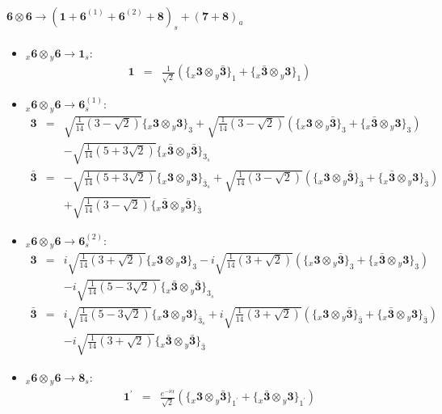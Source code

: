 \documentclass[english]{article}
\newcommand{\rep}[1]{\mathbf{#1}}
\newcommand{\repx}[2]{{}_{#2}\mathbf{#1}}
\newcommand{\subcg}[3]{\big\{ \repx{#1}{x}\otimes\repx{#2}{y}\big\}^{}_{#3}}
\begin{document}
\paragraph*{\Large $\rep{6}\otimes\rep{6}\to\left(\rep{1}+\rep{6}^{(1)}+\rep{6}^{(2)}+\rep{8}\right)_s+\left(\rep{7}+\rep{8}\right)_a$}
\begin{itemize}
\item $\repx{6}{x}\otimes\repx{6}{y}\to\rep{1}_{s}$:
\begin{eqnarray*}
\rep{1} &=& \frac{1}{\sqrt{2}}\left(\subcg{3}{\bar{3}}{1}+\subcg{\bar{3}}{3}{1}\right)
\end{eqnarray*}
\item $\repx{6}{x}\otimes\repx{6}{y}\to\rep{6}_{s}^{(1)}$:
\begin{eqnarray*}
\rep{3} &=& \sqrt{\frac{1}{14} \left(3-\sqrt{2}\right)}\subcg{3}{3}{3}+\sqrt{\frac{1}{14} \left(3-\sqrt{2}\right)}\left(\subcg{3}{\bar{3}}{3}+\subcg{\bar{3}}{3}{3}\right) \\ 
 & & -\sqrt{\frac{1}{14} \left(5+3 \sqrt{2}\right)}\subcg{\bar{3}}{\bar{3}}{3_{s}}
\\
\rep{\bar{3}} &=& -\sqrt{\frac{1}{14} \left(5+3 \sqrt{2}\right)}\subcg{3}{3}{\bar{3}_{s}}+\sqrt{\frac{1}{14} \left(3-\sqrt{2}\right)}\left(\subcg{3}{\bar{3}}{\bar{3}}+\subcg{\bar{3}}{3}{\bar{3}}\right) \\ 
 & & +\sqrt{\frac{1}{14} \left(3-\sqrt{2}\right)}\subcg{\bar{3}}{\bar{3}}{\bar{3}}
\end{eqnarray*}
\item $\repx{6}{x}\otimes\repx{6}{y}\to\rep{6}_{s}^{(2)}$:
\begin{eqnarray*}
\rep{3} &=& i \sqrt{\frac{1}{14} \left(3+\sqrt{2}\right)}\subcg{3}{3}{3}-i \sqrt{\frac{1}{14} \left(3+\sqrt{2}\right)}\left(\subcg{3}{\bar{3}}{3}+\subcg{\bar{3}}{3}{3}\right) \\ 
 & & -i \sqrt{\frac{1}{14} \left(5-3 \sqrt{2}\right)}\subcg{\bar{3}}{\bar{3}}{3_{s}}
\\
\rep{\bar{3}} &=& i \sqrt{\frac{1}{14} \left(5-3 \sqrt{2}\right)}\subcg{3}{3}{\bar{3}_{s}}+i \sqrt{\frac{1}{14} \left(3+\sqrt{2}\right)}\left(\subcg{3}{\bar{3}}{\bar{3}}+\subcg{\bar{3}}{3}{\bar{3}}\right) \\ 
 & & -i \sqrt{\frac{1}{14} \left(3+\sqrt{2}\right)}\subcg{\bar{3}}{\bar{3}}{\bar{3}}
\end{eqnarray*}
\item $\repx{6}{x}\otimes\repx{6}{y}\to\rep{8}_{s}$:
\begin{eqnarray*}
\rep{1^{\prime}} &=& \frac{e^{-i \alpha }}{\sqrt{2}}\left(\subcg{3}{\bar{3}}{1^{\prime}}+\subcg{\bar{3}}{3}{1^{\prime}}\right)

\end{eqnarray*}
\end{itemize}
\end{document}
